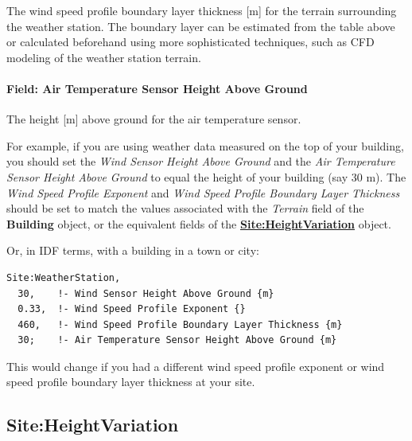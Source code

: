 The wind speed profile boundary layer thickness {[}m{]} for the terrain surrounding the weather station. The boundary layer can be estimated from the table above or calculated beforehand using more sophisticated techniques, such as CFD modeling of the weather station terrain.

\paragraph{Field: Air Temperature Sensor Height Above Ground}\label{field-air-temperature-sensor-height-above-ground}

The height {[}m{]} above ground for the air temperature sensor.

For example, if you are using weather data measured on the top of your building, you should set the \emph{Wind Sensor Height Above Ground} and the \emph{Air Temperature Sensor Height Above Ground} to equal the height of your building (say 30 m). The \emph{Wind Speed Profile Exponent} and \emph{Wind Speed Profile Boundary Layer Thickness} should be set to match the values associated with the \emph{Terrain} field of the \textbf{Building} object, or the equivalent fields of the \textbf{\hyperref[siteheightvariation]{Site:HeightVariation}} object.

Or, in IDF terms, with a building in a town or city:

\begin{lstlisting}
Site:WeatherStation,
  30,    !- Wind Sensor Height Above Ground {m}
  0.33,  !- Wind Speed Profile Exponent {}
  460,   !- Wind Speed Profile Boundary Layer Thickness {m}
  30;    !- Air Temperature Sensor Height Above Ground {m}
\end{lstlisting}

This would change if you had a different wind speed profile exponent or wind speed profile boundary layer thickness at your site.

\subsection{Site:HeightVariation}\label{siteheightvariation}

